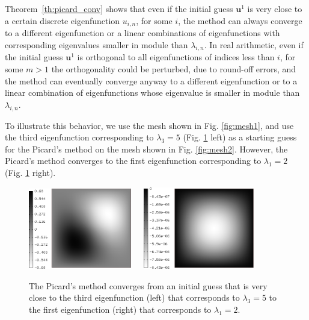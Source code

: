 \documentclass[preprint,12pt]{elsarticle}
\begin{document}
Theorem~\ref{th:picard_conv} shows that even if the initial guess $\mathbf{u}^1$ is very close to a certain discrete eigenfunction $u_{i,n}$, for some $i$, the method can always converge to a different eigenfunction or a linear combinations of eigenfunctions with corresponding eigenvalues smaller in module than $\lambda_{i,n}$. In real arithmetic, even if the initial guess $\mathbf{u}^1$ is orthogonal to all eigenfunctions of indices less than $i$, for some $m>1$ the orthogonality could be perturbed, due to round-off errors, and the method can eventually converge anyway to a different eigenfunction or to a linear combination of eigenfunctions whose eigenvalue is smaller in module than $\lambda_{i,n}$.

To illustrate this behavior, we use the mesh shown in Fig. \ref{fig:mesh1}, and use 
the third eigenfunction corresponding to $\lambda_3 = 5$ (Fig. \ref{fig:picard} left) 
as a starting guess for the Picard's method on the mesh shown in Fig. \ref{fig:mesh2}.
However, the Picard's method converges to the first eigenfunction corresponding 
to $\lambda_1 = 2$ (Fig. \ref{fig:picard} right).

\newpage

\begin{figure}[!ht]
\begin{center}
\includegraphics[width=0.4\textwidth]{img/eigen_2.png}\ \ \ 
\includegraphics[width=0.433\textwidth]{img/eigen-new-1.png}
\end{center}
\vspace{-5mm}
\caption{The Picard's method converges from an initial guess that is very close to 
         the third eigenfunction (left) that corresponds to $\lambda_3 = 5$ to the 
         first eigenfunction (right) that corresponds to $\lambda_1 = 2$.}
\label{fig:picard}
\end{figure}
\end{document}
